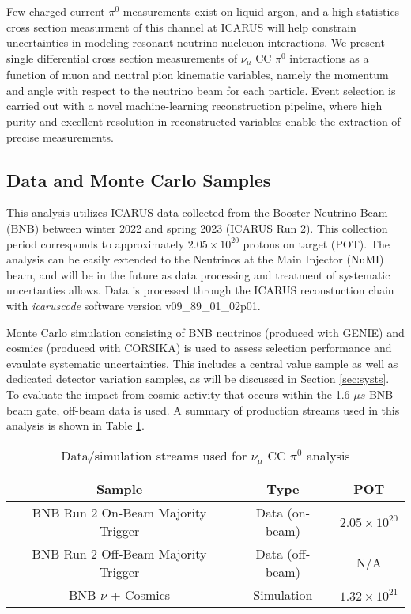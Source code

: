 \documentclass[../main.tex]{subfiles}
\begin{document}
Few charged-current $\pi^{0}$ measurements exist on liquid argon, and a high statistics cross section measurment of this channel at ICARUS will help constrain uncertainties in modeling resonant neutrino-nucleuon interactions.  We present single differential cross section measurements of $\nu_{\mu}$ CC $\pi^{0}$ interactions as a function of muon and neutral pion kinematic variables, namely the momentum and angle with respect to the neutrino beam for each particle.  Event selection is carried out with a novel machine-learning reconstruction pipeline, where high purity and excellent resolution in reconstructed variables enable the extraction of precise measurements.

\subsection{Data and Monte Carlo Samples}
This analysis utilizes ICARUS data collected from the Booster Neutrino Beam (BNB) between winter 2022 and spring 2023 (ICARUS Run 2).  This collection period corresponds to approximately $2.05 \times 10^{20}$ protons on target (POT).  The analysis can be easily extended to the Neutrinos at the Main Injector (NuMI) beam, and will be in the future as data processing and treatment of systematic uncertanties allows.  Data is processed through the ICARUS reconstuction chain with \textit{icaruscode} software version v09\_89\_01\_02p01.

Monte Carlo simulation consisting of BNB neutrinos (produced with GENIE) and cosmics (produced with CORSIKA) is used to assess selection performance and evaulate systematic uncertainties.  This includes a central value sample as well as dedicated detector variation samples, as will be discussed in Section \ref{sec:systs}.  To evaluate the impact from cosmic activity that occurs within the 1.6 $\mu s$ BNB beam gate, off-beam data is used.  A summary of production streams used in this analysis is shown in Table \ref{Tab:prod}.

\begin{table}[ht]
    \caption{Data/simulation streams used for $\nu_{\mu}$ CC $\pi^{0}$ analysis}
    \vspace{0.1cm}
    \centering
    \begin{tabular}{ c c c } 
    \hline
    Sample  &  Type & POT  \\
    \hline
    BNB Run 2 On-Beam Majority Trigger & Data (on-beam) & $2.05 \times 10^{20}$ \\ 
    BNB Run 2 Off-Beam Majority Trigger & Data (off-beam) & N/A \\
    BNB $\nu$ + Cosmics & Simulation & $1.32 \times 10^{21}$ \\
    \hline
    \end{tabular}
    \label{Tab:prod}
\end{table}
\end{document}
